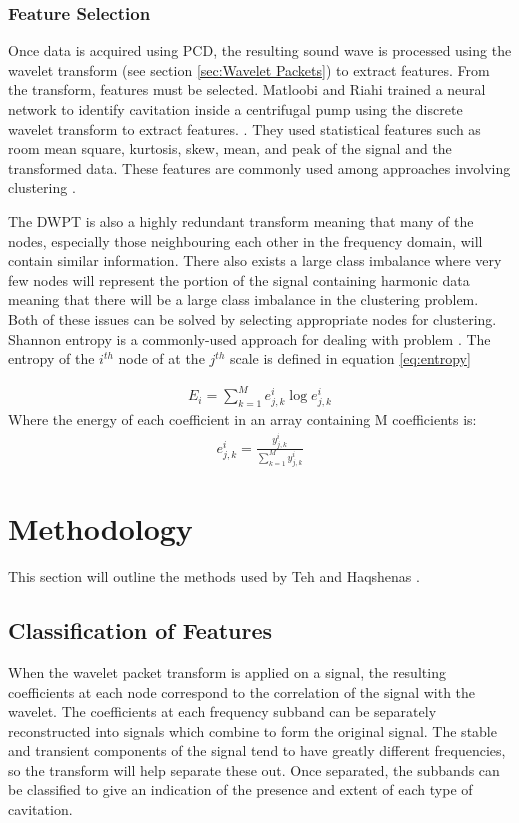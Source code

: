 \documentclass[reprint,NumberedRefs]{JASA}
\begin{document}
\subsubsection{Feature Selection}
Once data is acquired using PCD, the resulting sound wave is processed using the wavelet transform (see section \ref{sec:Wavelet Packets}) to extract features. From the transform, features must be selected. Matloobi and Riahi trained a neural network to identify cavitation inside a centrifugal pump using the discrete wavelet transform to extract features. \cite{matloobi2021identification}. They used statistical features such as room mean square, kurtosis, skew, mean, and peak of the signal and the transformed data. These features are commonly used among approaches involving clustering \cite{yiakopoulos2011rolling} \cite{shete2013k}.

The DWPT is also a highly redundant transform \cite{mallat1999wavelet} meaning that many of the nodes, especially those neighbouring each other in the frequency domain, will contain similar information. There also exists a large class imbalance where very few nodes will represent the portion of the signal containing harmonic data meaning that there will be a large class imbalance in the clustering problem. Both of these issues can be solved by selecting appropriate nodes for clustering. Shannon entropy is a commonly-used approach for dealing with problem \cite{kim2012heath}. The entropy of the $i^{th}$ node of at the $j^{th}$ scale is defined in equation \ref{eq:entropy}

\begin{align}
E_i = \sum^M_{k=1}{e^i_{j,k}\log{e^i_{j,k}}}\label{eq:entropy}
\end{align}
Where the energy of each coefficient in an array containing M coefficients is:
\begin{align}
e^i_{j,k}=\frac{y^i_{j,k}}{\sum^M_{k=1}{y^i_{j,k}}}
\end{align}

\section{Methodology}
\label{sec:methodology}
This section will outline the methods used by Teh \cite{Teh2014} and Haqshenas \cite{Haqshenas_2015}.

\subsection{Classification of Features}
When the wavelet packet transform is applied on a signal, the resulting coefficients at each node correspond to the correlation of the signal with the wavelet. The coefficients at each frequency subband can be separately reconstructed into signals which combine to form the original signal. The stable and transient components of the signal tend to have greatly different frequencies, so the transform will help separate these out. Once separated, the subbands can be classified to give an indication of the presence and extent of each type of cavitation.
\end{document}
